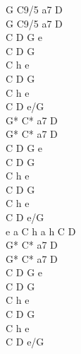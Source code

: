 \begin{text}
G C9/5 a7 D\\
G C9/5 a7 D\\
C D G e\\
C D G\\

C h e\\
C D G\\
C h e\\
C D e/G\\

G* C* a7 D\\
G* C* a7 D\\
C D G e\\
C D G\\

C h e\\
C D G\\
C h e\\
C D e/G\\
\vin e a C h a h C D\\

G* C* a7 D\\
G* C* a7 D\\
C D G e\\
C D G\\

C h e\\
C D G\\
C h e\\
C D e/G\\
\end{text}
